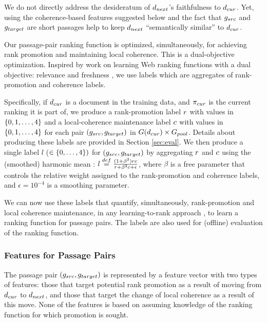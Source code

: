 We do not directly address the 
desideratum of $d_{next}$'s faithfulness to $d_{cur}$. Yet, using the coherence-based features suggested below and the fact that $g_{src}$ and $g_{target}$ are short passages help to 
keep $d_{next}$ ``semantically similar'' to $d_{cur}$.

Our passage-pair ranking function is optimized, simultaneously,
for achieving rank promotion and maintaining local coherence. This is a dual-objective
optimization. Inspired by work on learning Web ranking functions
with a dual objective: relevance and freshness
\cite{Dong+al:10a,Dong+al:10b,Dai+al:11a}, we use labels which are aggregates of rank-promotion and coherence labels. 

Specifically, if $d_{cur}$ is a document in the training data, and $\pi_{cur}$ is the current ranking it is part of, we
produce a rank-promotion label $r$ with values in
$\{0, 1, \ldots, 4\}$ and a local-coherence maintenance label $c$ with
values in $\{0, 1, \ldots, 4\}$ for each pair $(g_{src},g_{target})$
in $ G(d_{cur}) \times G_{pool}$.
Details about producing these labels are provided in Section
\ref{sec:eval}. We then produce a single label $l$ ($\in \{0,\ldots,4\})$ for $(g_{src},g_{target})$ by aggregating
    $r$ and $c$ using the (smoothed) harmonic mean \cite{Dai+al:11a}:
    $l \stackrel{def}{=}
    \frac{(1+\beta^2)r
      c}{r + \beta^2 c +
      \epsilon}$, where $\beta$ is a free parameter that controls the
    relative weight assigned to the rank-promotion and coherence
    labels, and $\epsilon = 10^{-4}$ is a smoothing parameter.

We can now use these labels that quantify, simultaneously,
rank-promotion and local coherence maintenance, in any learning-to-rank approach
\cite{Liu:11a}, to learn a ranking function for passage pairs. The
labels are also used for (offline) evaluation of the ranking function.


\subsubsection{Features for Passage Pairs}
\label{sec:features}
The passage pair $(g_{src},g_{target})$ is represented by a feature
vector with two types of features: those that target potential rank
promotion as a result of moving from $d_{cur}$ to $d_{next}$, and those that target the
change of local coherence as a result of this move. None of the features is based on assuming knowledge of the ranking function for which promotion is sought.


